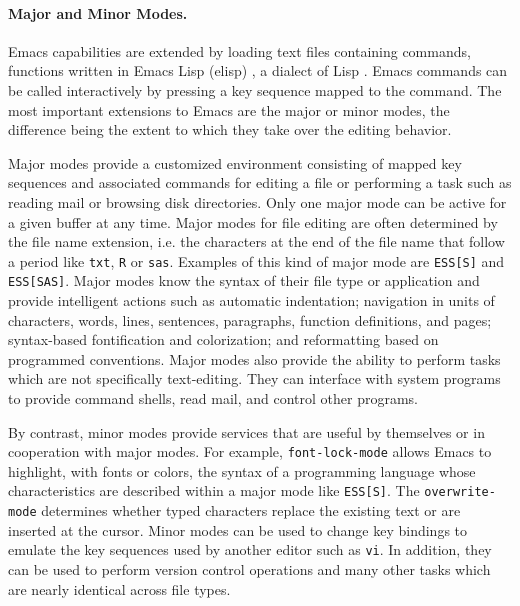 \documentclass{article}
\newcommand{\stexttt}[1]{{\small\texttt{#1}}}
\begin{document}
\paragraph{Major and Minor Modes.}
Emacs capabilities are extended by loading text files containing commands,
functions written in Emacs Lisp (elisp) \citep{RChassell1999}, a dialect of Lisp
\citep{PGraham:1996}.  Emacs commands
can be called interactively by pressing a key sequence mapped to the command.
The most important extensions to Emacs are the major or minor modes,
the difference being the extent to which they take over the editing behavior.

Major modes provide a customized environment consisting of mapped key sequences
and associated commands for editing a file or performing a task such
as reading mail or browsing disk directories.  Only one major mode can
be active for a given buffer at any time.  Major modes for file
editing are often determined by the file name extension, i.e. the
characters at the end of the file name that follow a period like
\stexttt{txt}, \stexttt{R} or \stexttt{sas}.  Examples of this kind of
major mode are \stexttt{ESS[S]} and \stexttt{ESS[SAS]}.  Major modes
know the syntax of their file type or application and %
provide intelligent actions such as automatic indentation; navigation
in units of characters, words, lines, sentences, paragraphs, function
definitions, and pages; syntax-based fontification and colorization;
and reformatting based on programmed conventions.  Major modes also
provide the ability to perform tasks which are not specifically
text-editing.  They can interface with system programs to provide
command shells, read mail, and control other programs.

By contrast, minor modes provide services that are useful by
themselves or in cooperation with major modes.  For
example, \stexttt{font-lock-mode} allows Emacs to highlight, with
fonts or colors, the syntax of a programming language whose
characteristics are described within a major mode like
\stexttt{ESS[S]}.  The \stexttt{overwrite-mode} determines whether
typed characters replace the existing text or are inserted at the
cursor.  Minor modes can be used to change key bindings to emulate the
key sequences used by another editor such as \stexttt{vi}.  In addition, they
can be used to perform version control operations and many other tasks
which are nearly identical across file types.
\end{document}
